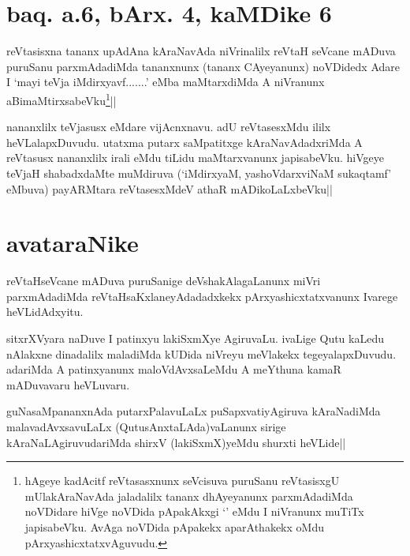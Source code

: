 \section*{baq. a.6, bArx. 4, kaMDike 6}

\stext

\begin{artha}
reVtasisxna tananx upAdAna kAraNavAda niVrinalilx reVtaH seVcane 
mADuva puruSanu parxmAdadiMda tananxnunx (tananx CAyeyanunx) noVDidedx 
Adare I `mayi teVja iMdirxyavf.......' eMba maMtarxdiMda A niVranunx 
aBimaMtirxsabeVku\footnote[2]{hAgeye kadAcitf reVtasasxnunx seVcisuva 
puruSanu reVtasisxgU mUlakAraNavAda jaladalilx tananx dhAyeyanunx 
parxmAdadiMda noVDidare hiVge noVDida pApakAkxgi `\stext' eMdu I 
niVranunx muTiTx japisabeVku. AvAga noVDida pApakekx aparAthakekx oMdu 
pArxyashicxtatxvAguvudu.}||
\end{artha}


\begin{artha}
nananxlilx teVjasusx eMdare vijAcnxnavu. adU reVtasesxMdu ililx 
heVLalapxDuvudu. utatxma putarx saMpatitxge kAraNavAdadxriMda A 
reVtasusx nananxlilx irali eMdu tiLidu maMtarxvanunx japisabeVku. 
hiVgeye teVjaH shabadxdaMte muMdiruva (`iMdirxyaM, yashoVdarxviNaM 
sukaqtamf' eMbuva) payARMtara reVtasesxMdeV athaR mADikoLaLxbeVku||
\end{artha}

\section*{avataraNike}
reVtaHseVcane mADuva puruSanige deVshakAlagaLanunx miVri parxmAdadiMda 
reVtaHsaKxlaneyAdadadxkekx pArxyashicxtatxvanunx Ivarege heVLidAdxyitu.


\begin{artha}
sitxrXVyara naDuve I patinxyu lakiSxmXye AgiruvaLu. ivaLige Qutu 
kaLedu nAlakxne dinadalilx maladiMda kUDida niVreyu meVlakekx 
tegeyalapxDuvudu. adariMda A patinxyanunx maloVdAvxsaLeMdu A meYthuna 
kamaR mADuvavaru heVLuvaru.
\end{artha}


\begin{artha}
guNasaMpananxnAda putarxPalavuLaLx puSapxvatiyAgiruva kAraNadiMda 
malavadAvxsavuLaLx (QutusAnxtaLAda)vaLanunx sirige 
kAraNaLAgiruvudariMda shirxV (lakiSxmX)yeMdu shurxti heVLide|| 
\end{artha}

